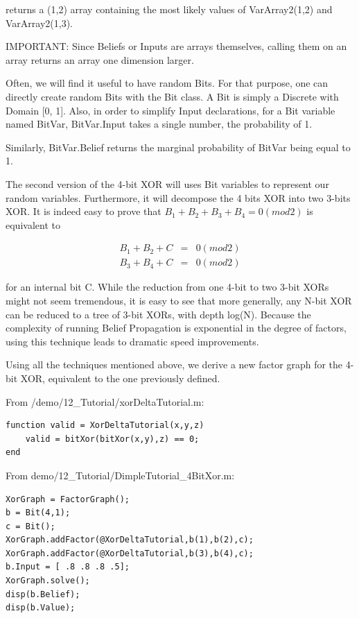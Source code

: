 returns a (1,2) array containing the most likely values of VarArray2(1,2) and VarArray2(1,3).

IMPORTANT: Since Beliefs or Inputs are arrays themselves, calling them on an array returns an array one dimension larger.

\fi

Often, we will find it useful to have random Bits. For that purpose, one can directly create random Bits with the Bit class. A Bit is simply a Discrete with Domain [0, 1]. Also, in order to simplify Input declarations, for a Bit variable named BitVar, BitVar.Input takes a single number, the probability of 1. 

\ifmatlab
Similarly, BitVar.Belief returns the marginal probability of BitVar being equal to 1.
\fi

The second version of the 4-bit XOR will uses Bit variables to represent our random variables. Furthermore, it will decompose the 4 bits XOR into two 3-bits XOR. It is indeed easy to prove that $ B_1 + B_2 + B_3 + B_4 = 0(mod 2) $ is equivalent to


\begin{eqnarray*}
B_1+B_2+C &=& 0(mod 2) \\
B_3+B_4+C &=& 0(mod 2)
\end{eqnarray*}


for an internal bit C. While the reduction from one 4-bit to two 3-bit XORs might not seem tremendous, it is easy to see that more generally, any N-bit XOR can be reduced to a tree of 3-bit XORs, with depth log(N). Because the complexity of running Belief Propagation is exponential in the degree of factors, using this technique leads to dramatic speed improvements.

Using all the techniques mentioned above, we derive a new factor graph for the 4-bit XOR, equivalent to the one previously defined.

\ifmatlab

From /demo/12\_Tutorial/xorDeltaTutorial.m:


\begin{lstlisting}
function valid = XorDeltaTutorial(x,y,z)       
    valid = bitXor(bitXor(x,y),z) == 0;
end
\end{lstlisting}



From demo/12\_Tutorial/DimpleTutorial\_4BitXor.m:

\begin{lstlisting}
XorGraph = FactorGraph();
b = Bit(4,1);
c = Bit();
XorGraph.addFactor(@XorDeltaTutorial,b(1),b(2),c);
XorGraph.addFactor(@XorDeltaTutorial,b(3),b(4),c);
b.Input = [ .8 .8 .8 .5];
XorGraph.solve();
disp(b.Belief);
disp(b.Value);
\end{lstlisting}

